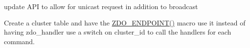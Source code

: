 \begin{DoxyRefList}
\item[\label{todo__todo000015}%
\Hypertarget{todo__todo000015}%
Global \hyperlink{group__zcl__client_ga4c75937cc0fa5c70c63f30b59a4ddebc}{zdo\+\_\+send\+\_\+match\+\_\+desc} (\hyperlink{structwpan__dev__t}{wpan\+\_\+dev\+\_\+t} $\ast$dev, const uint16\+\_\+t $\ast$clusters, uint16\+\_\+t profile\+\_\+id, wpan\+\_\+response\+\_\+fn callback, const void F\+AR $\ast$context)]update A\+PI to allow for unicast request in addition to broadcast  
\item[\label{todo__todo000023}%
\Hypertarget{todo__todo000023}%
File \hyperlink{zigbee__zdo_8c}{zigbee\+\_\+zdo.c} ]Create a cluster table and have the \hyperlink{group__zdo_gaef7118e478f5ad9949dcd23f6e0901c9}{Z\+D\+O\+\_\+\+E\+N\+D\+P\+O\+I\+N\+T()} macro use it instead of having zdo\+\_\+handler use a switch on cluster\+\_\+id to call the handlers for each command. 
\end{DoxyRefList}